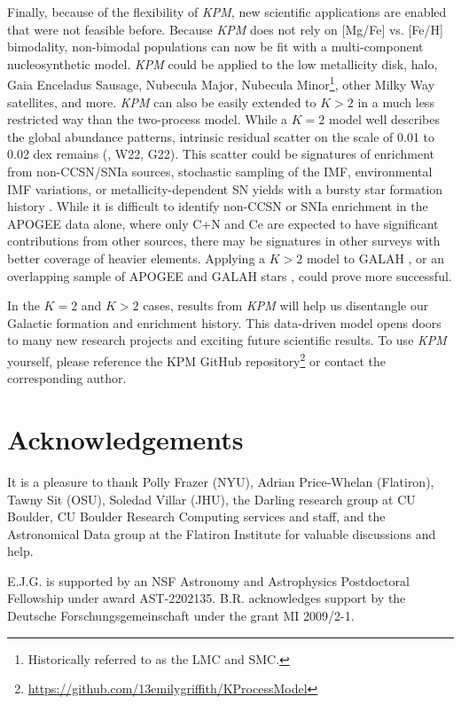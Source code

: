 \documentclass[modern]{aastex631}
\newcommand{\name}{\textsl{KPM}}
\begin{document}
Finally, because of the flexibility of \name{}, new scientific applications are enabled that were not feasible before. Because \name{} does not rely on [Mg/Fe] vs. [Fe/H] bimodality, non-bimodal populations can now be fit with a multi-component nucleosynthetic model. \name{} could be applied to the low metallicity disk, halo, Gaia Enceladus Sausage, Nubecula Major, Nubecula Minor\footnote{Historically referred to as the LMC and SMC.}, other Milky Way satellites, and more. \name{} can also be easily extended to $K>2$ in a much less restricted way than the two-process model. While a $K=2$ model well describes the global abundance patterns, intrinsic residual scatter on the scale of 0.01 to 0.02 dex remains (\citealp{ting2022}, W22, G22). This scatter could be signatures of enrichment from non-CCSN/SNIa sources, stochastic sampling of the IMF, environmental IMF variations, or metallicity-dependent SN yields with a bursty star formation history \citep[e.g.][]{belokurov2022, griffith2023}. While it is difficult to identify non-CCSN or SNIa enrichment in the APOGEE data alone, where only C+N and Ce are expected to have significant contributions from other sources, there may be signatures in other surveys with better coverage of heavier elements. Applying a $K>2$ model to GALAH \citep{buder2021}, or an overlapping sample of APOGEE and GALAH stars \citep{nandakumar2022}, could prove more successful. 

In the $K=2$ and $K>2$ cases, results from \name{} will help us disentangle our Galactic formation and enrichment history. This data-driven model opens doors to many new research projects and exciting future scientific results. To use \name{} yourself, please reference the KPM GitHub repository\footnote{\url{https://github.com/13emilygriffith/KProcessModel}} or contact the corresponding author. 


\section{Acknowledgements}
It is a pleasure to thank
  Polly Frazer (NYU),
  Adrian Price-Whelan (Flatiron),
  Tawny Sit (OSU),
  Soledad Villar (JHU),
  the Darling research group at CU Boulder,
  CU Boulder Research Computing services and staff,
  and the Astronomical Data group at the Flatiron Institute
for valuable discussions and help.

E.J.G. is supported by an NSF Astronomy and Astrophysics Postdoctoral Fellowship under award AST-2202135.
B.R. acknowledges support by the Deutsche Forschungsgemeinschaft under the 
grant MI 2009/2-1.
\end{document}
